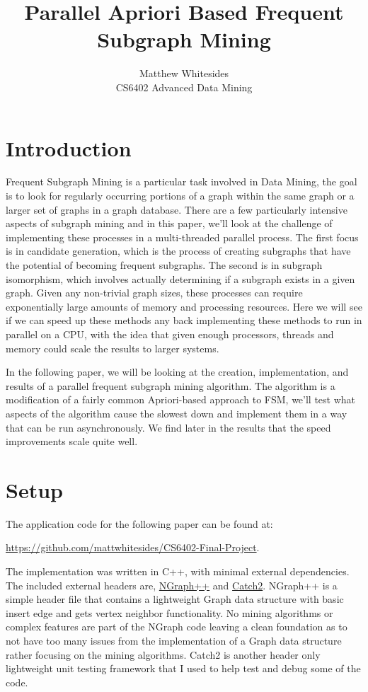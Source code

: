 \documentclass{article}
\title{Parallel Apriori Based Frequent Subgraph Mining}
\author{Matthew Whitesides\\
  \large CS6402 Advanced Data Mining}
\begin{document}
\maketitle

\section{Introduction}
Frequent Subgraph Mining is a particular task involved in Data Mining, the goal is to look for regularly occurring portions of a graph within the same graph or a larger set of graphs in a graph database. There are a few particularly intensive aspects of subgraph mining and in this paper, we'll look at the challenge of implementing these processes in a multi-threaded parallel process. The first focus is in candidate generation, which is the process of creating subgraphs that have the potential of becoming frequent subgraphs. The second is in subgraph isomorphism, which involves actually determining if a subgraph exists in a given graph. Given any non-trivial graph sizes, these processes can require exponentially large amounts of memory and processing resources. Here we will see if we can speed up these methods any back implementing these methods to run in parallel on a CPU, with the idea that given enough processors, threads and memory could scale the results to larger systems. 

In the following paper, we will be looking at the creation, implementation, and results of a parallel frequent subgraph mining algorithm. The algorithm is a modification of a fairly common Apriori-based approach to FSM, we'll test what aspects of the algorithm cause the slowest down and implement them in a way that can be run asynchronously. We find later in the results that the speed improvements scale quite well. 

\section{Setup}
The application code for the following paper can be found at:

\href{https://github.com/mattwhitesides/CS6402-Final-Project}{https://github.com/mattwhitesides/CS6402-Final-Project}. 

The implementation was written in C++, with minimal external dependencies. The included external headers are, \href{https://math.nist.gov/~RPozo/graph/ngraph_index.html}{NGraph++} and \href{https://github.com/catching/Catch2}{Catch2}. NGraph++ is a simple header file that contains a lightweight Graph data structure with basic insert edge and gets vertex neighbor functionality. No mining algorithms or complex features are part of the NGraph code leaving a clean foundation as to not have too many issues from the implementation of a Graph data structure rather focusing on the mining algorithms. Catch2 is another header only lightweight unit testing framework that I used to help test and debug some of the code.
\end{document}
